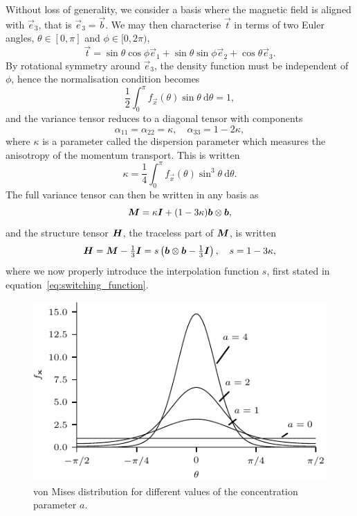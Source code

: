 Without loss of generality, we consider a basis where the magnetic field is aligned with $\vec{e}_3$, that is $\vec{e}_3 = \vec{b}$. We may then characterise $\vec{t}$ in terms of two Euler angles, $\theta \in [0, \pi]$ and $\phi \in [0, 2\pi)$,
\begin{equation}
  \label{eq:t_in_euler}
\vec{t} = \sin \theta \cos \phi \vec{e}_1 + \sin \theta \sin \phi \vec{e}_2 + \cos \theta \vec{e}_3.
\end{equation}
By rotational symmetry around $\vec{e}_3$, the density function must be independent of $\phi$, hence the normalisation condition becomes
\begin{equation}
  \label{eq:normalisation_condition2}
\frac{1}{2} \int_0^{\pi} f_{\vec{x}} (\theta) \sin \theta\ \text{d} \theta = 1,
\end{equation}
and the variance tensor reduces to a diagonal tensor with components
\begin{equation}
  \label{eq:variance_diagonals}
\alpha_{11} = \alpha_{22} = \kappa, \quad \alpha_{33} = 1-2\kappa,
\end{equation}
where $\kappa$ is a parameter called the dispersion parameter which measures the anisotropy of the momentum transport. This is written
\begin{equation}
  \label{eq:kappa}
\kappa = \frac{1}{4} \int_0^{\pi} f_{\vec{x}} (\theta) \sin^3 \theta\ \text{d} \theta.
\end{equation}
The full variance tensor can then be written in any basis as
\begin{equation}
  \label{eq:variance_tensor_compact}
{\bm M} = \kappa {\bm I} + (1-3\kappa) {\bm b} \otimes {\bm b},
\end{equation}
and the structure tensor ${\bm H}$, the traceless part of ${\bm M}$, is written
\begin{equation}
  \label{eq:structure_tensor}
{\bm H} = {\bm M} - \tfrac{1}{3} {\bm I} = s \left ( {\bm b} \otimes {\bm b} - \tfrac{1}{3} {\bm I} \right), \quad s = 1 - 3\kappa,
\end{equation}
where we now properly introduce the interpolation function $s$, first stated in equation~\ref{eq:switching_function}.

\begin{figure}[t]
  \centering
  \includegraphics[width=0.5\linewidth]{von_mises_distribution.pdf}
  \caption{von Mises distribution for different values of the concentration parameter $a$.}%
  \label{fig:von_mises_distribution}
\end{figure}

